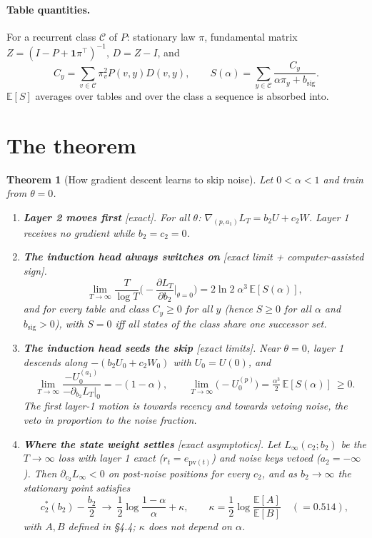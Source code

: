 \documentclass[11pt]{article}
\newtheorem{theorem}{Theorem}\newtheorem{lemma}{Lemma}\newtheorem{proposition}{Proposition}
\theoremstyle{definition}\newtheorem{assumption}{Assumption}\newtheorem{definition}{Definition}
\theoremstyle{remark}\newtheorem{remark}{Remark}
\newcommand{\1}{\mathbf{1}}\newcommand{\E}{\mathbb E}
\begin{document}
\paragraph{Table quantities.} For a recurrent class $\mathcal C$ of $P$: stationary law $\pi$, fundamental matrix
$Z=(I-P+\1\pi^\top)^{-1}$, $D=Z-I$, and
\[
C_y=\sum_{v\in\mathcal C}\pi_v^2P(v,y)D(v,y),\qquad S(\alpha)=\sum_{y\in\mathcal C}\frac{C_y}{\alpha\pi_y+b_{\mathrm{sig}}}.
\]
$\E[S]$ averages over tables and over the class a sequence is absorbed into.

\section{The theorem}
\begin{theorem}[How gradient descent learns to skip noise]\label{thm}
Let $0<\alpha<1$ and train from $\theta=0$.
\begin{enumerate}[label=(\roman*),leftmargin=2em]
\item \textbf{Layer 2 moves first} [exact]. For all $\theta$: $\nabla_{(p,a_1)}L_T=b_2U+c_2W$. Layer 1 receives
no gradient while $b_2=c_2=0$.

\item \textbf{The induction head always switches on} [exact limit + computer-assisted sign].
\[
\lim_{T\to\infty}\frac{T}{\log T}\Big(-\frac{\partial L_T}{\partial b_2}\Big|_{\theta=0}\Big)=2\ln2\;\alpha^3\,\E[S(\alpha)],
\]
and for every table and class $C_y\ge0$ for all $y$ (hence $S\ge0$ for all $\alpha$ and $b_{\mathrm{sig}}>0$), with
$S=0$ iff all states of the class share one successor set.

\item \textbf{The induction head seeds the skip} [exact limits]. Near $\theta=0$, layer 1 descends along
$-(b_2U_0+c_2W_0)$ with $U_0=U(0)$, and
\[
\lim_{T\to\infty}\frac{-U_0^{(a_1)}}{-\partial_{b_2}L_T|_0}=-(1-\alpha),\qquad
\lim_{T\to\infty}\big(-U_0^{(p)}\big)=\tfrac{\alpha^3}{2}\,\E[S(\alpha)]\ \ge0 .
\]
The first layer-1 motion is towards recency and towards vetoing noise, the veto in proportion to the
noise fraction.

\item \textbf{Where the state weight settles} [exact asymptotics]. Let $L_\infty(c_2;b_2)$ be the
$T\to\infty$ loss with layer 1 exact ($r_t=e_{\mathrm{pv}(t)}$) and noise keys vetoed ($a_2=-\infty$). Then
$\partial_{c_2}L_\infty<0$ on post-noise positions for every $c_2$, and as $b_2\to\infty$ the stationary
point satisfies
\[
c_2^\ast(b_2)-\frac{b_2}2\ \longrightarrow\ \frac12\log\frac{1-\alpha}{\alpha}+\kappa,\qquad
\kappa=\frac12\log\frac{\E[A]}{\E[B]}\quad(=0.514),
\]
with $A,B$ defined in \S4.4; $\kappa$ does not depend on $\alpha$.


\end{enumerate}
\end{theorem}
\end{document}

